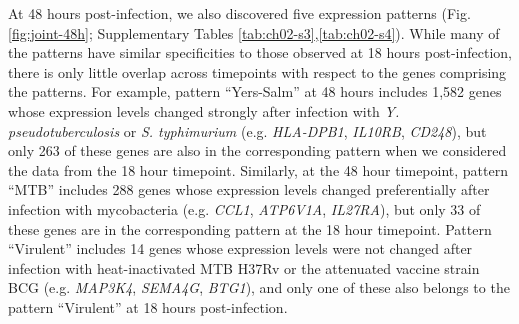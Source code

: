 At 48 hours post-infection, we also discovered five expression patterns
(Fig. \ref{fig:joint-48h}; Supplementary Tables \ref{tab:ch02-s3},\ref{tab:ch02-s4}). While many of the patterns have
similar specificities to those observed at 18 hours post-infection,
there is only little overlap across timepoints with respect to the genes
comprising the patterns. For example, pattern ``Yers-Salm'' at 48 hours
includes 1,582 genes whose expression levels changed strongly after
infection with \emph{Y. pseudotuberculosis} or \emph{S. typhimurium}
(e.g. \emph{HLA-DPB1}, \emph{IL10RB}, \emph{CD248}), but only 263 of
these genes are also in the corresponding pattern when we considered the
data from the 18 hour timepoint. Similarly, at the 48 hour timepoint,
pattern ``MTB'' includes 288 genes whose expression levels changed
preferentially after infection with mycobacteria (e.g. \emph{CCL1},
\emph{ATP6V1A}, \emph{IL27RA}), but only 33 of these genes are in the
corresponding pattern at the 18 hour timepoint. Pattern ``Virulent''
includes 14 genes whose expression levels were not changed after
infection with heat-inactivated MTB H37Rv or the attenuated vaccine
strain BCG (e.g. \emph{MAP3K4}, \emph{SEMA4G}, \emph{BTG1}), and only
one of these also belongs to the pattern ``Virulent'' at 18 hours
post-infection.

